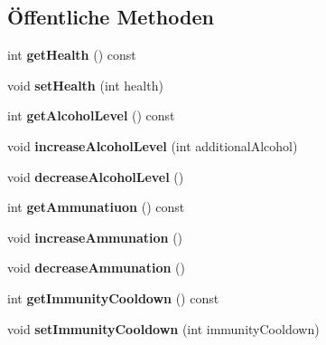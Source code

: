 \subsection*{Öffentliche Methoden}
\begin{DoxyCompactItemize}
\item 
\hypertarget{classPlayer_a3042adb49808b2629137f4d85b6b5fd3}{int {\bfseries get\-Health} () const }\label{classPlayer_a3042adb49808b2629137f4d85b6b5fd3}

\item 
\hypertarget{classPlayer_a8f28f6b069f7388877e02ae0a175d4ab}{void {\bfseries set\-Health} (int health)}\label{classPlayer_a8f28f6b069f7388877e02ae0a175d4ab}

\item 
\hypertarget{classPlayer_a486b82d4d244039a03d387d41885650b}{int {\bfseries get\-Alcohol\-Level} () const }\label{classPlayer_a486b82d4d244039a03d387d41885650b}

\item 
\hypertarget{classPlayer_a59ca71be81f1f60884c183bcb59ec180}{void {\bfseries increase\-Alcohol\-Level} (int additional\-Alcohol)}\label{classPlayer_a59ca71be81f1f60884c183bcb59ec180}

\item 
\hypertarget{classPlayer_a169348f8fee6e5fcd226666c5d0828bf}{void {\bfseries decrease\-Alcohol\-Level} ()}\label{classPlayer_a169348f8fee6e5fcd226666c5d0828bf}

\item 
\hypertarget{classPlayer_af1f0af69e333caf0433f760a3eec6278}{int {\bfseries get\-Ammunatiuon} () const }\label{classPlayer_af1f0af69e333caf0433f760a3eec6278}

\item 
\hypertarget{classPlayer_a7e55451588b8cada842cdb255066e434}{void {\bfseries increase\-Ammunation} ()}\label{classPlayer_a7e55451588b8cada842cdb255066e434}

\item 
\hypertarget{classPlayer_a2f0f8c03a11e3f41d1ca511533b67b9b}{void {\bfseries decrease\-Ammunation} ()}\label{classPlayer_a2f0f8c03a11e3f41d1ca511533b67b9b}

\item 
\hypertarget{classPlayer_a99a3c0636d141ffeecfe3c83e772b787}{int {\bfseries get\-Immunity\-Cooldown} () const }\label{classPlayer_a99a3c0636d141ffeecfe3c83e772b787}

\item 
\hypertarget{classPlayer_a360fe426d92da74fdbff2bffec48b863}{void {\bfseries set\-Immunity\-Cooldown} (int immunity\-Cooldown)}\label{classPlayer_a360fe426d92da74fdbff2bffec48b863}


\end{DoxyCompactItemize}
